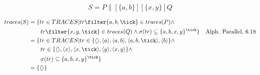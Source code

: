 \documentclass{scrreprt}
\begin{document}
\newpage

\begin{equation*}
  S = P \parallel[\{a, b\}][\{x, y\}] Q
\end{equation*}

\begin{align*}
  traces(S) &= \{ tr \in TRACES | tr \filter \{ a,b, \tick \} \in traces(P) \wedge \\
            &\hspace{0.7cm} tr \filter \{ x, y, \tick \} \in traces(Q) \wedge \sigma(tr) \subseteq \{ a, b, x, y \}^{\tick} \} & \text{Alph. Parallel, 6.18} \\
            &= \{ tr \in TRACES | tr \in \{ \langle \rangle, \langle a \rangle, \langle a, b \rangle, \langle a, b, \tick \rangle, \langle b \rangle \} \wedge \\
            &\hspace{0.7cm} tr \in \{ \langle \rangle, \langle x \rangle, \langle x, \tick \rangle, \langle y \rangle, \langle x, y \rangle \} \wedge \\
            &\hspace{0.7cm} \sigma(tr) \subseteq \{ a, b, x, y \}^{\tick} \} \\
            &= \{ \langle \rangle \}
\end{align*}
\end{document}
